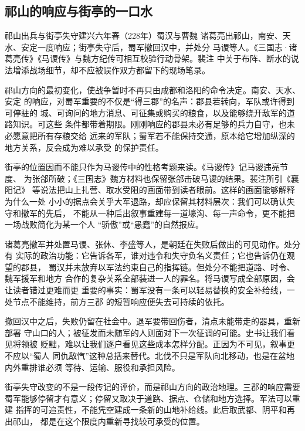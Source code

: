 \subsection{祁山的响应与街亭的一口水}

\begin{event}{祁山出兵与街亭失守}{建兴六年春（228年）}{蜀汉与曹魏}{}
诸葛亮出祁山，南安、天水、安定一度响应；街亭失守后，蜀军撤回汉中，并处分
马谡等人。《三国志·诸葛亮传》《马谡传》与魏方纪传可相互校验行动骨架。裴注
中关于布阵、断水的说法增添战场细节，却不应被误作双方都留下的现场笔录。
\end{event}

祁山方向的最初变化，使战争暂时不再只由成都和洛阳的命令决定。南安、天水、安定
的响应，对蜀军重要的不仅是“得三郡”的名声：郡县若转向，军队或许得到可停驻的
城、可询问的地方消息、可征集或购买的粮食，以及能够绕开敌军的道路知识。可这些
条件都带着期限。刚刚响应的郡县未必有足够的兵力自守，也未必愿意把所有存粮交给
远来的军队；蜀军若不能保持交通，原本给它增加纵深的地方关系，反会成为难以承受
的保护责任。

街亭的位置因而不能只作为马谡传中的性格考题来读。《马谡传》记马谡违亮节度、
为张郃所破；《三国志》魏方材料也保留张郃击破马谡的结果。裴注所引《襄阳记》
等说法把山上扎营、取水受阻的画面带到读者眼前。这样的画面能够解释为什么一处
小小的据点会关乎大军退路，却应保留其材料层次：我们可以确认失守和撤军的先后，
不能从一种后出叙事重建每一道壕沟、每一声命令，更不能把一场战败简化为某一个人
“骄傲”或“愚蠢”的自然报应。

诸葛亮撤军并处置马谡、张休、李盛等人，是朝廷在失败后做出的可见动作。处分有
实际的政治功能：它告诉各军，谁对违令和失守负名义责任；它也告诉仍在观望的郡县，
蜀汉并未放弃以军法约束自己的指挥链。但处分不能把道路、时令、魏军援军和地方
合作的复杂关系全部装进一人的罪名。将马谡写成全部原因，会让读者错过更难而更
重要的事实：蜀军没有一条可以轻易替换的安全补给线，一处节点不能维持，前方三郡
的短暂响应便失去可持续的依托。

撤回汉中之后，失败仍留在社会中。退军要带回伤者，清点未能带走的器具，重新部署
守山口的人；被征发而未随军的人则面对下一次征调的可能。史书让我们看见将领被
贬黜，难以让我们逐户看见这些成本怎样分配。正因为不可见，叙事更不应以“蜀人
同仇敌忾”这种总括来替代。北伐不只是军队向北移动，也是在盆地内外重排谁必须
等待、运输、服役和承担风险。

\begin{turningpoint}
街亭失守改变的不是一段传记的评价，而是祁山方向的政治地理。三郡的响应需要
蜀军能够停留才有意义；停留又取决于道路、据点、仓储和地方选择。军法可以重建
指挥的可追责性，不能凭空建成一条新的山地补给线。此后取武都、阴平和再出祁山，
都是在这个限度内重新寻找较可承受的位置。
\end{turningpoint}

